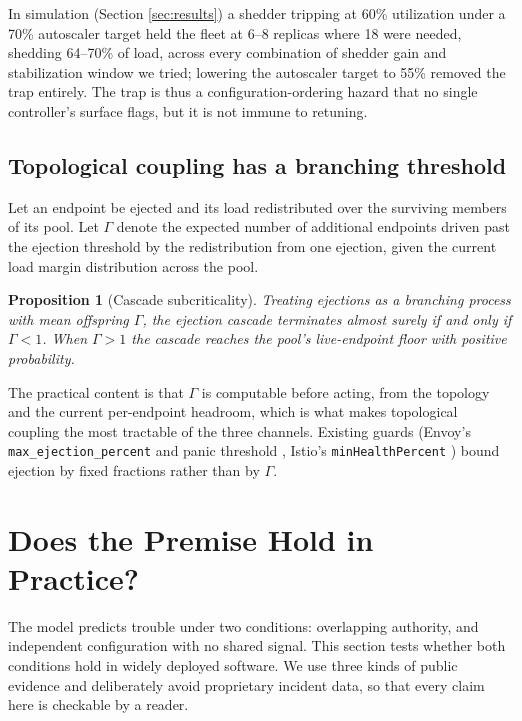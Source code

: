 \documentclass[conference]{IEEEtran}
\newtheorem{proposition}{Proposition}
\begin{document}
In simulation (Section \ref{sec:results}) a shedder tripping at 60\%
utilization under a 70\% autoscaler target held the fleet at 6--8 replicas
where 18 were needed, shedding 64--70\% of load, across every combination of
shedder gain and stabilization window we tried; lowering the autoscaler target to 55\%
removed the trap entirely. The trap is thus a configuration-ordering hazard
that no single controller's surface flags, but it is not immune to retuning.

\subsection{Topological coupling has a branching threshold}

Let an endpoint be ejected and its load redistributed over the surviving
members of its pool. Let $\Gamma$ denote the expected number of additional
endpoints driven past the ejection threshold by the redistribution from one
ejection, given the current load margin distribution across the pool.

\begin{proposition}[Cascade subcriticality]
\label{prop:cascade}
Treating ejections as a branching process with mean offspring $\Gamma$, the
ejection cascade terminates almost surely if and only if $\Gamma < 1$. When
$\Gamma > 1$ the cascade reaches the pool's live-endpoint floor with positive
probability.
\end{proposition}

The practical content is that $\Gamma$ is computable before acting, from the
topology and the current per-endpoint headroom, which is what makes
topological coupling the most tractable of the three channels. Existing
guards (Envoy's \texttt{max\_ejection\_percent} and panic threshold
\cite{envoyoutlier,envoypanic}, Istio's \texttt{minHealthPercent}
\cite{istiodr}) bound ejection by fixed fractions rather than by $\Gamma$.

\section{Does the Premise Hold in Practice?}
\label{sec:evidence}

The model predicts trouble under two conditions: overlapping authority, and
independent configuration with no shared signal. This section tests
whether both conditions hold in widely deployed software. We use three
kinds of public evidence and deliberately avoid proprietary incident data,
so that every claim here is checkable by a reader.
\end{document}
